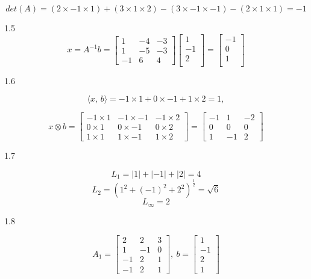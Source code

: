 \documentclass[11pt]{article}
\begin{document}
\begin{enumerate}
$$
det(A)= (2 \times -1 \times 1) + (3 \times 1 \times 2) - (3 \times -1 \times -1) - (2 \times 1 \times 1) = -1
$$

1.5
$$x = A^{-1}b = \begin{bmatrix}
    1 & -4 & -3 \\
    1 & -5 & -3 \\
    -1 & 6 & 4
\end{bmatrix}\begin{bmatrix}
    1 \\
    -1 \\
    2 \\
\end{bmatrix}=\begin{bmatrix}
    -1 \\
    0 \\
    1 \\
\end{bmatrix}$$

1.6

$$
\langle x,\, b \rangle = -1 \times 1 + 0 \times -1 + 1 \times 2 = 1,
$$

$$
x \otimes b = \begin{bmatrix}
    -1 \times 1 & -1 \times -1 & -1 \times 2 \\
    0 \times 1 & 0 \times -1 & 0 \times 2 \\
    1 \times 1 & 1 \times -1 & 1 \times 2
\end{bmatrix}=\begin{bmatrix}
    -1 & 1 & -2 \\
    0 & 0 & 0 \\
    1 & -1 & 2
\end{bmatrix}
$$

1.7

$$ L_1= |1| + |-1| + |2| = 4 $$
$$ L_2= (1^2 + (-1)^2 + 2^2)^\frac{1}{2} = \sqrt{6} $$
$$ L_\infty = 2 $$

1.8

$$
A_1 = \begin{bmatrix}
    2 & 2 & 3 \\
    1 & -1 & 0 \\
    -1 & 2 & 1 \\
    -1 & 2 & 1
\end{bmatrix},
\:
b = \begin{bmatrix}
    1 \\
    -1 \\
    2 \\
    1
\end{bmatrix}
$$


\end{enumerate}
\end{document}
